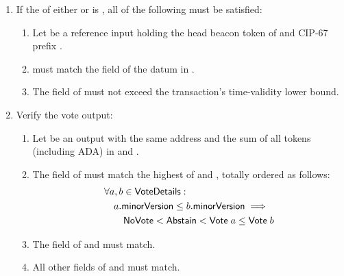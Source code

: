 \documentclass[../hydrozoa.tex]{subfiles}
\begin{document}
\begin{description}
\begin{itemize}
        \begin{enumerate}[resume]
          \item If the  of either  or  is , all of the following must be satisfied:
            \begin{enumerate}
              \item Let  be a reference input holding the head beacon token of  and CIP-67 prefix .
              \item {} must match the  field of the  datum in .
              \item The  field of  must not exceed the transaction's time-validity lower bound.
            \end{enumerate}
      \item Verify the vote output:
        \begin{enumerate}[resume]
          \item Let  be an output with the same address and the sum of all tokens (including ADA) in  and .
          \item The  field of  must match the highest  of  and , totally ordered as follows:
            \begin{equation*}
            \begin{split}
              &\forall a, b \in \mathsf{VoteDetails}:\\
              &\quad a \mathsf{.minorVersion} \leq b \mathsf{.minorVersion} \implies\\
              &\qquad \mathsf{NoVote} < \mathsf{Abstain} < \mathsf{Vote} \; a \leq \mathsf{Vote} \; b  
            \end{split}
            \end{equation*}
          \item The  field of  and  must match.
          \item All other fields of  and  must match.
        \end{enumerate}
        \end{enumerate}
    \end{itemize}
\end{description}
\end{document}
